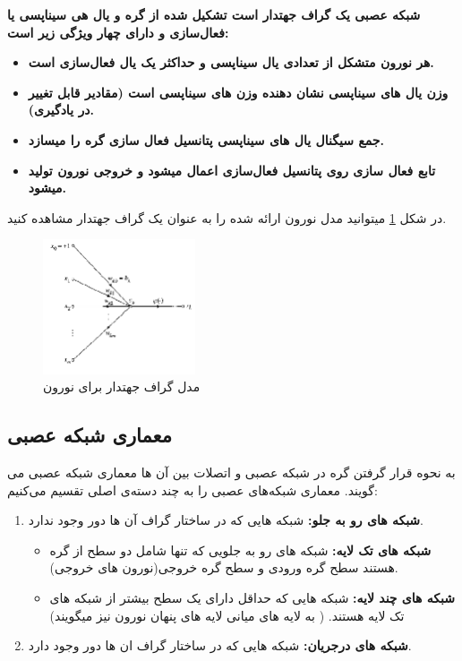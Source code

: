 \documentclass[11pt,a4paper,twocolumn]{article}
\begin{document}
\textbf{شبکه عصبی یک گراف جهتدار است تشکیل شده از گره و یال هی سیناپسی یا فعال‌سازی و دارای چهار ویژگی زیر است:
}
\begin{itemize}
\item\textbf{
هر نورون متشکل از تعدادی یال سیناپسی و حداکثر یک یال فعال‌سازی است.}
\item\textbf{
وزن یال های سیناپسی نشان دهنده وزن های سیناپسی است (مقادیر قابل تغییر در یادگیری).}
\item\textbf{
جمع سیگنال یال های سیناپسی پتانسیل فعال سازی گره را میسازد.}
\item\textbf{
تابع فعال سازی روی پتانسیل فعال‌سازی اعمال میشود و خروجی نورون تولید میشود.}
\end{itemize}
در شکل
\ref{fig:neuron-graph}
میتوانید مدل نورون ارائه شده را به عنوان یک گراف جهتدار مشاهده کنید.
\begin{figure}
  \centering
    \includegraphics[width=0.4\textwidth]{neuron-graph.png}
  \caption{مدل گراف جهتدار برای نورون}
  \label{fig:neuron-graph}
\end{figure}

\subsection{معماری شبکه عصبی}
به نحوه قرار گرفتن گره در شبکه عصبی و اتصلات بین آن ها معماری شبکه عصبی می گویند. معماری شبکه‌های عصبی را به چند دسته‌ی اصلی تقسیم می‌کنیم:

\begin{enumerate}
\item
\textbf{شبکه های رو به جلو:}
شبکه هایی که در ساختار گراف آن ها دور وجود ندارد. 
\begin{itemize}
\item
\textbf{شبکه های تک لایه:}
شبکه های رو به جلویی که تنها شامل دو سطح از گره هستند سطح گره ورودی و سطح گره خروجی(نورون های خروجی).
\item
\textbf{شبکه های چند لایه:}
شبکه هایی که حداقل دارای یک سطح بیشتر از شبکه های تک لایه هستند. ( به لایه های میانی لایه های پنهان نورون نیز میگویند)
\end{itemize}
\item
\textbf{شبکه های درجریان:}
شبکه هایی که در ساختار گراف ان ها دور وجود دارد.
\end{enumerate}
\end{document}
